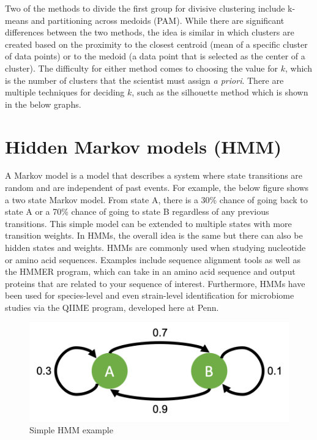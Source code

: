 \documentclass[12pt,openany]{book}
\begin{document}
Two of the methods to divide the first group for divisive clustering
include k-means and partitioning across medoids (PAM). While there are
significant differences between the two methods, the idea is similar in
which clusters are created based on the proximity to the closest
centroid (mean of a specific cluster of data points) or to the medoid (a
data point that is selected as the center of a cluster). The difficulty
for either method comes to choosing the value for \(k\), which is the
number of clusters that the scientist must assign \emph{a priori}. There
are multiple techniques for deciding \(k\), such as the silhouette
method which is shown in the below graphs.

\section{Hidden Markov models (HMM)}\label{hidden-markov-models-hmm}

A Markov model is a model that describes a system where state
transitions are random and are independent of past events. For example,
the below figure shows a two state Markov model. From state A, there is
a 30\% chance of going back to state A or a 70\% chance of going to
state B regardless of any previous transitions. This simple model can be
extended to multiple states with more transition weights. In HMMs, the
overall idea is the same but there can also be hidden states and
weights. HMMs are commonly used when studying nucleotide or amino acid
sequences. Examples include sequence alignment tools as well as the
HMMER program, which can take in an amino acid sequence and output
proteins that are related to your sequence of interest. Furthermore,
HMMs have been used for species-level and even strain-level
identification for microbiome studies via the QIIME program, developed
here at Penn.

\begin{figure}

{\centering \includegraphics[width=0.35\linewidth]{fig/mm_fig} 

}

\caption{Simple HMM example}\label{fig:unnamed-chunk-6}
\end{figure}


\end{document}
